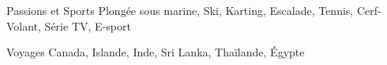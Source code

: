 

\begin{cvskills}

	\cvskill
		{Passions et Sports} %
		{Plongée sous marine, Ski, Karting, Escalade, Tennis, Cerf-Volant, Série TV, E-sport} %

	\cvskill
		{Voyages} %
		{Canada, Islande, Inde, Sri Lanka, Thaïlande, Égypte} %


\end{cvskills}
